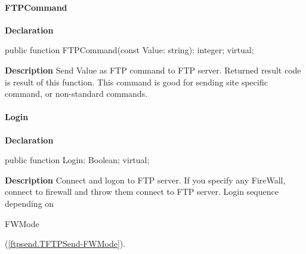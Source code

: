\documentclass{report}
\newif\ifpdf
\begin{document}
\paragraph*{FTPCommand}\hspace*{\fill}

\label{ftpsend.TFTPSend-FTPCommand}
\begin{list}{}{
\setlength{\itemindent}{0cm}
\setlength{\listparindent}{0cm}
\setlength{\leftmargin}{\evensidemargin}
\addtolength{\leftmargin}{\tmplength}
\settowidth{\labelsep}{X}
\addtolength{\leftmargin}{\labelsep}
\setlength{\labelwidth}{\tmplength}
}
\item[\textbf{Declaration}\hfill]
\ifpdf
\begin{flushleft}
\fi
\begin{ttfamily}
public function FTPCommand(const Value: string): integer; virtual;\end{ttfamily}

\ifpdf
\end{flushleft}
\fi

\par
\item[\textbf{Description}]
Send Value as FTP command to FTP server. Returned result code is result of this function. This command is good for sending site specific command, or non{-}standard commands.

\end{list}
\paragraph*{Login}\hspace*{\fill}

\label{ftpsend.TFTPSend-Login}
\begin{list}{}{
\setlength{\itemindent}{0cm}
\setlength{\listparindent}{0cm}
\setlength{\leftmargin}{\evensidemargin}
\addtolength{\leftmargin}{\tmplength}
\settowidth{\labelsep}{X}
\addtolength{\leftmargin}{\labelsep}
\setlength{\labelwidth}{\tmplength}
}
\item[\textbf{Declaration}\hfill]
\ifpdf
\begin{flushleft}
\fi
\begin{ttfamily}
public function Login: Boolean; virtual;\end{ttfamily}

\ifpdf
\end{flushleft}
\fi

\par
\item[\textbf{Description}]
Connect and logon to FTP server. If you specify any FireWall, connect to firewall and throw them connect to FTP server. Login sequence depending on \begin{ttfamily}FWMode\end{ttfamily}(\ref{ftpsend.TFTPSend-FWMode}).

\end{list}
\end{document}
